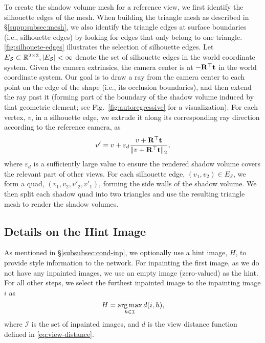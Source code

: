 To create the shadow volume mesh for a reference view, we first identify the silhouette edges of the mesh. When building the triangle mesh as described in \S\ref{supp:subsec:mesh}, we also identify the triangle edges at surface boundaries (i.e., silhouette edges) by looking for edges that only belong to one triangle. \cref{fig:silhouete-edges} illustrates the selection of silhouette edges. Let $E_\mathcal{S} \subset \mathbb{R}^{2 \times 3}, \left|E_\mathcal{S}\right| < \infty$ denote the set of silhouette edges in the world coordinate system. Given the camera extrinsics, the camera center is at $-\mathbf{R}^\top \mathbf{t}$ in the world coordinate system. Our goal is to draw a ray from the camera center to each point on the edge of the shape (i.e., its occlusion boundaries), and then extend the ray past it (forming part of the boundary of the shadow volume induced by that geometric element; see Fig.~\ref{fig:autoregressive} for a visualization).
For each vertex, $v$, in a silhouette edge, we extrude it along its corresponding ray direction according to the reference camera, as
\begin{equation}
v' = v + \varepsilon_d \frac{
    v + \mathbf{R}^\top \mathbf{t}
}{
    \left\|
        v + \mathbf{R}^\top \mathbf{t}
    \right\|_2
},
\end{equation}
where $\varepsilon_d$ 
is a sufficiently large value to ensure the rendered shadow volume covers the relevant part of other views. For each silhouette edge, $(v_1, v_2) \in E_\mathcal{S}$, we form a quad, $(v_1, v_2, v'_2, v'_1)$, forming the side walls of the shadow volume. We then split each shadow quad into two triangles and use the resulting triangle mesh to render the shadow volumes.

\subsection{Details on the Hint Image}
\label{supp:subsec:hint}

As mentioned in \S\ref{subsubsec:cond-inp}, we optionally use a hint image, $H$, to provide style information to the network. For inpainting the first image, as we do not have any inpainted images, we use an empty image (zero-valued) as the hint. For all other steps, we select the furthest inpainted image to the inpainting image $i$ as
\begin{equation}
H = \operatorname*{arg\,max}_{h \in \mathcal{I}} d(i, h),
\end{equation}
where $\mathcal{I}$ is the set of inpainted images, and $d$ is the view distance function defined in \cref{eq:view-distance}.

